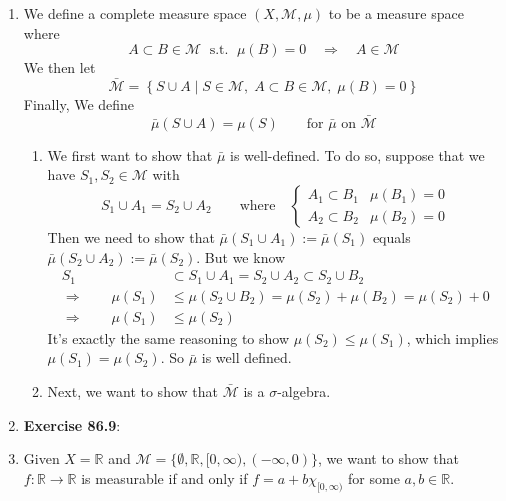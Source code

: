 \documentclass[12pt]{article}
\theoremstyle{plain}
\theoremstyle{definition}
\theoremstyle{remark}
\begin{document}
\begin{enumerate}
\newpage
\item We define a complete measure space $(X,\mathscr{M}, \mu)$ to be a measure space where 
\[
    A\subset B\in\mathscr{M} \; \text{ s.t. }\;\mu(B)=0 
    \quad\Rightarrow\quad A\in\mathscr{M}
\]
We then let 
\[
    \bar{\mathscr{M}} = \left\{ S\cup A \; | \;  
        S\in\mathscr{M}, \; A\subset B\in\mathscr{M}, \;  
        \mu(B)=0
    \right\}
\]
Finally, We define 
\[
    \bar{\mu}(S\cup A) = \mu(S)  \qquad 
    \text{for $\bar{\mu}$ on $\bar{\mathscr{M}}$}
\]
\begin{enumerate}
\item We first want to show that $\bar{\mu}$ is well-defined. To do so, suppose that we have $S_1, S_2\in\mathscr{M}$ with 
\[
    S_1 \cup A_1 = S_2 \cup A_2 
    \qquad \text{where} \quad
    \begin{cases}
    A_1 \subset B_1 &\mu(B_1) = 0\\ A_2 \subset B_2 &\mu(B_2) = 0
    \end{cases}
\]
Then we need to show that $\bar{\mu}(S_1\cup A_1):=\bar{\mu}(S_1)$ equals $\bar{\mu}(S_2\cup A_2):=\bar{\mu}(S_2)$. But we know
\begin{align*}
    S_1 &\subset S_1 \cup A_1 = S_2 \cup A_2 \subset 
        S_2 \cup B_2 \\
    \Rightarrow \qquad
    \mu(S_1) &\leq 
        \mu(S_2 \cup B_2) = \mu(S_2) + \mu(B_2) = 
        \mu(S_2) + 0 \\
    \Rightarrow \qquad
        \mu(S_1) &\leq 
        \mu(S_2)
\end{align*}
It's exactly the same reasoning to show $\mu(S_2) \leq \mu(S_1)$, which implies $\mu(S_1) = \mu(S_2)$. So $\bar{\mu}$ is well defined.

\item Next, we want to show that $\bar{\mathscr{M}}$ is a $\sigma$-algebra. 

\end{enumerate}


\item \textbf{Exercise 86.9}:  


\item Given $X=\mathbb{R}$ and $\mathscr{M} = \{\emptyset, \mathbb{R}, [0,\infty), (-\infty,0)\}$, we want to show that $f:\mathbb{R}\rightarrow\mathbb{R}$ is measurable if and only if $f=a+b\chi_{[0,\infty)}$ for some $a,b\in\mathbb{R}$. 
    

\end{enumerate}
\end{document}
